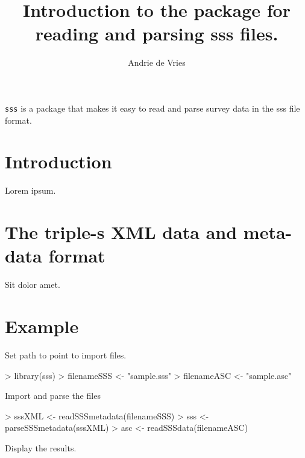 \documentclass[a4paper]{article}
\title{Introduction to the \sss{} package for reading and parsing sss files.}
\author{Andrie de Vries}
\newcommand{\sss}{{\tt sss}}
\begin{document}
\maketitle

\sss{} is a package that makes it easy to read and parse survey data in the sss file format.

\section{Introduction}

Lorem ipsum.


\section{The triple-s XML data and meta-data format}

Sit dolor amet.

\section{Example}

Set path to point to import files.

\begin{Schunk}
\begin{Sinput}
> library(sss)
> filenameSSS <- "sample.sss"
> filenameASC <- "sample.asc"
\end{Sinput}
\end{Schunk}

Import and parse the files

\begin{Schunk}
\begin{Sinput}
> sssXML <- readSSSmetadata(filenameSSS)
> sss <- parseSSSmetadata(sssXML)
> asc <- readSSSdata(filenameASC)
\end{Sinput}
\end{Schunk}

Display the results.
\end{document}
